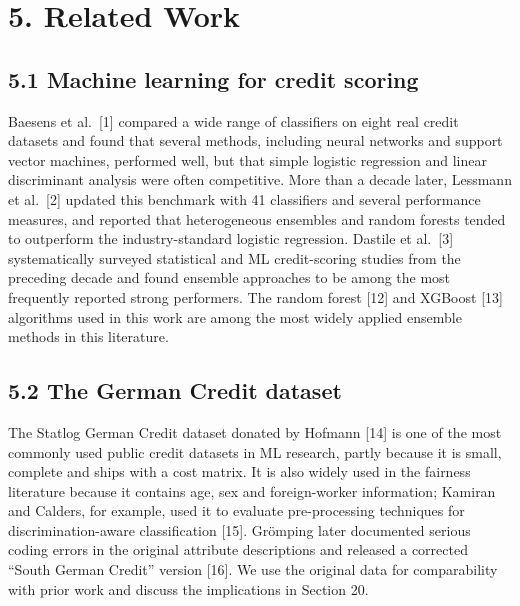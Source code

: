 \documentclass[
  11pt,
]{article}
\begin{document}
\hypertarget{related-work}{%
\section{5. Related Work}\label{related-work}}

\hypertarget{machine-learning-for-credit-scoring}{%
\subsection{5.1 Machine learning for credit
scoring}\label{machine-learning-for-credit-scoring}}

Baesens et al.~{[}1{]} compared a wide range of classifiers on eight
real credit datasets and found that several methods, including neural
networks and support vector machines, performed well, but that simple
logistic regression and linear discriminant analysis were often
competitive. More than a decade later, Lessmann et al.~{[}2{]} updated
this benchmark with 41 classifiers and several performance measures, and
reported that heterogeneous ensembles and random forests tended to
outperform the industry-standard logistic regression. Dastile et
al.~{[}3{]} systematically surveyed statistical and ML credit-scoring
studies from the preceding decade and found ensemble approaches to be
among the most frequently reported strong performers. The random forest
{[}12{]} and XGBoost {[}13{]} algorithms used in this work are among the
most widely applied ensemble methods in this literature.

\hypertarget{the-german-credit-dataset}{%
\subsection{5.2 The German Credit
dataset}\label{the-german-credit-dataset}}

The Statlog German Credit dataset donated by Hofmann {[}14{]} is one of
the most commonly used public credit datasets in ML research, partly
because it is small, complete and ships with a cost matrix. It is also
widely used in the fairness literature because it contains age, sex and
foreign-worker information; Kamiran and Calders, for example, used it to
evaluate pre-processing techniques for discrimination-aware
classification {[}15{]}. Grömping later documented serious coding errors
in the original attribute descriptions and released a corrected ``South
German Credit'' version {[}16{]}. We use the original data for
comparability with prior work and discuss the implications in Section
20.
\end{document}
